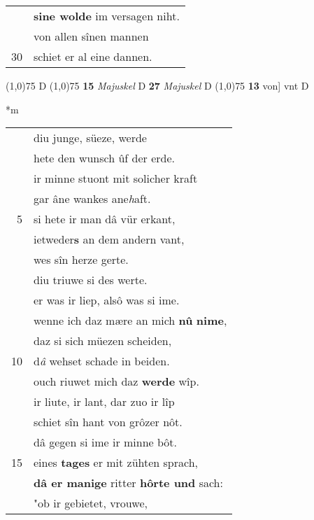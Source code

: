 \documentclass[8pt,a4paper,notitlepage]{article}
\begin{document}
\begin{table}[ht]
\begin{minipage}[t]{0.5\linewidth}
\begin{tabular}{rl}
 & \textbf{sine wolde} im versagen niht.\\ 
 & von allen sînen mannen\\ 
30 & schiet er al eine dannen.\\ 
\end{tabular}
\scriptsize
\line(1,0){75} \newline
D \newline
\line(1,0){75} \newline
\textbf{15} \textit{Majuskel} D  \textbf{27} \textit{Majuskel} D  \newline
\line(1,0){75} \newline
\textbf{13} von] vnt D \newline
\end{minipage}
\hspace{0.5cm}
\begin{minipage}[t]{0.5\linewidth}
\small
\begin{center}*m
\end{center}
\begin{tabular}{rl}
 & diu junge, süeze, werde\\ 
 & hete den wunsch ûf der erde.\\ 
 & ir minne stuont mit solicher kraft\\ 
 & gar âne wankes ane\textit{h}aft.\\ 
5 & si hete ir man dâ vür erkant,\\ 
 & ietweder\textbf{s} an dem andern vant,\\ 
 & wes sîn herze gerte.\\ 
 & diu triuwe si des werte.\\ 
 & er was ir liep, alsô was si ime.\\ 
 & wenne ich daz mære an mich \textbf{nû} \textbf{nime},\\ 
 & daz si sich müezen scheiden,\\ 
10 & d\textit{â} wehset schade in beiden.\\ 
 & ouch riuwet mich daz \textbf{werde} wîp.\\ 
 & ir liute, ir lant, dar zuo ir lîp\\ 
 & schiet sîn hant von grôzer nôt.\\ 
 & dâ gegen si ime ir minne bôt.\\ 
15 & eines \textbf{tages} er mit zühten sprach,\\ 
 & \textbf{dâ er manige} ritter \textbf{hôrte und} sach:\\ 
 & "ob ir gebietet, vrouwe,\\ 

\end{tabular}
\end{minipage}
\end{table}
\end{document}
